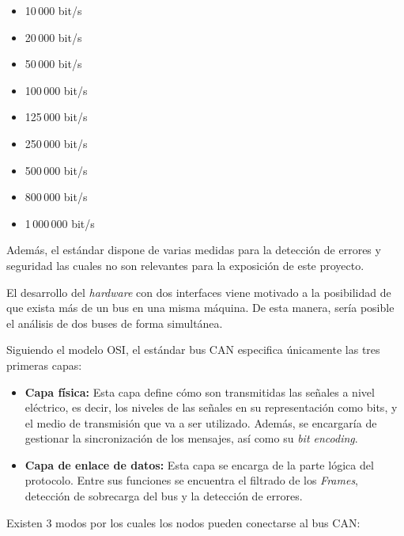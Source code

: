 \begin{itemize}
\tightlist
\item
10\,000 bit/s
\item
20\,000 bit/s
\item
50\,000 bit/s
\item
100\,000 bit/s
\item
125\,000 bit/s
\item
250\,000 bit/s
\item
500\,000 bit/s
\item
800\,000 bit/s
\item
1\,000\,000 bit/s
\end{itemize}


Además, el estándar dispone de varias medidas para la detección de errores y seguridad las cuales no son relevantes para la exposición de este proyecto.

El desarrollo del \emph{hardware} con dos interfaces viene motivado a la posibilidad de que exista más de un bus en una misma máquina. De esta manera, sería posible el análisis de dos buses de forma simultánea.

Siguiendo el modelo OSI\cite{osi:can}, el estándar bus CAN especifica únicamente las tres primeras capas:

\begin{itemize}

\item
\textbf{Capa física:} Esta capa define cómo son transmitidas las señales a nivel eléctrico, es decir, los niveles de las señales en su representación como bits, y el medio de transmisión que va a ser utilizado. Además, se encargaría de gestionar la sincronización de los mensajes, así como su \emph{bit encoding}.

\item
\textbf{Capa de enlace de datos:} Esta capa se encarga de la parte lógica del protocolo. Entre sus funciones se encuentra el filtrado de los \emph{Frames}, detección de sobrecarga del bus y la detección de errores.

\end{itemize}

Existen 3 modos por los cuales los nodos pueden conectarse al bus CAN:


